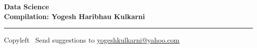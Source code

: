 
\graphicspath{{images/}}



\footnotesize


\begin{center}
\Large{\textbf{Data Science\\ Compilation: Yogesh Haribhau Kulkarni}}  
\end{center}

\begin{multicols}{2}

\end{multicols}

\rule{\linewidth}{0.25pt}
\scriptsize
Copyleft \textcopyleft\  Send suggestions to 
\href{http://www.yogeshkulkarni.com}{yogeshkulkarni@yahoo.com}


